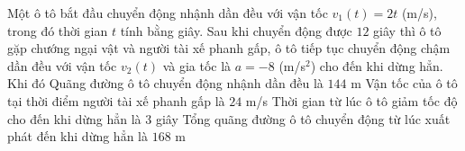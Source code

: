 \begin{ex}%
	Một ô tô bắt đầu chuyển động nhậnh dần đều với vận tốc $v_1 (t)=2t$ (m/s), trong đó thời gian $t$ tính bằng giây. Sau khi chuyển động được $12$ giây  thì ô tô gặp chướng ngại vật và người tài xế phanh gấp, ô tô tiếp tục chuyển động chậm dần đều với vận tốc $v_2 (t)$ và gia tốc là $a=-8$ (m/s$^2$) cho đến khi dừng hẳn. Khi đó
	\choiceTF 
		{\True Quãng đường ô tô chuyển động nhậnh dần đều  là $144$ m}
		{\True Vận tốc của ô tô tại thời điểm người tài xế phanh gấp  là $24$ m/s}
		{\True Thời gian từ  lúc ô tô giảm tốc độ cho đến khi dừng hẳn là $3$ giây}
		{Tổng quãng đường ô tô chuyển động từ lúc xuất phát đến khi dừng hẳn là $168$ m} 
\end{ex}

